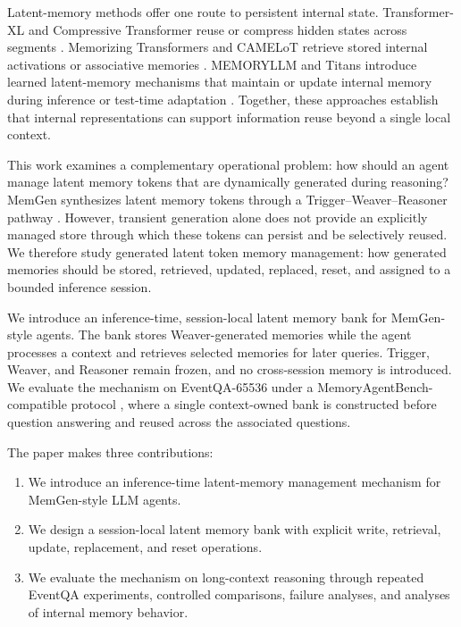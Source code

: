 Latent-memory methods offer one route to persistent internal state. Transformer-XL and Compressive Transformer reuse or compress hidden states across segments \cite{dai2019transformerxl,rae2019compressive}. Memorizing Transformers and CAMELoT retrieve stored internal activations or associative memories \cite{wu2022memorizing,he2024camelot}. MEMORYLLM and Titans introduce learned latent-memory mechanisms that maintain or update internal memory during inference or test-time adaptation \cite{wang2024memoryllm,behrouz2025titans}. Together, these approaches establish that internal representations can support information reuse beyond a single local context.

This work examines a complementary operational problem: how should an agent manage latent memory tokens that are dynamically generated during reasoning? MemGen synthesizes latent memory tokens through a Trigger--Weaver--Reasoner pathway \cite{zhang2025memgen}. However, transient generation alone does not provide an explicitly managed store through which these tokens can persist and be selectively reused. We therefore study generated latent token memory management: how generated memories should be stored, retrieved, updated, replaced, reset, and assigned to a bounded inference session.

We introduce an inference-time, session-local latent memory bank for MemGen-style agents. The bank stores Weaver-generated memories while the agent processes a context and retrieves selected memories for later queries. Trigger, Weaver, and Reasoner remain frozen, and no cross-session memory is introduced. We evaluate the mechanism on EventQA-65536 under a MemoryAgentBench-compatible protocol \cite{hu2026evaluating}, where a single context-owned bank is constructed before question answering and reused across the associated questions.

The paper makes three contributions:

\begin{enumerate}
\item We introduce an inference-time latent-memory management mechanism for MemGen-style LLM agents.
\item We design a session-local latent memory bank with explicit write, retrieval, update, replacement, and reset operations.
\item We evaluate the mechanism on long-context reasoning through repeated EventQA experiments, controlled comparisons, failure analyses, and analyses of internal memory behavior.
\end{enumerate}
